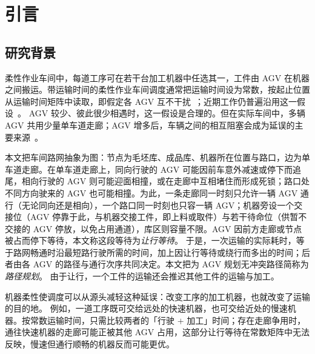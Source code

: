 \documentclass[manuscript,screen,review]{acmart}
\begin{document}
\maketitle
\section{引言}
\label{sec:Chapter_I}

\subsection{研究背景}

柔性作业车间中，每道工序可在若干台加工机器中任选其一，工件由 AGV 在机器之间搬运。带运输时间的柔性作业车间调度通常把运输时间设为常数，按起止位置从运输时间矩阵中读取，即假定各 AGV 互不干扰~\cite{xin2025review}；近期工作仍普遍沿用这一假设~\cite{meng2025cp,qin2026knowledge,jafarian2026integrated}。
AGV 较少、彼此很少相遇时，这一假设是合理的。但在实际车间中，多辆 AGV 共用少量单车道走廊；AGV 增多后，车辆之间的相互阻塞会成为延误的主要来源~\cite{kim2026congestion,hardai2025matrix}。

本文把车间路网抽象为图：节点为毛坯库、成品库、机器所在位置与路口，边为单车道走廊。在单车道走廊上，同向行驶的 AGV 可能因前车意外减速或停下而追尾，相向行驶的 AGV 则可能迎面相撞，或在走廊中互相堵住而形成死锁；路口处不同方向驶来的 AGV 也可能相撞。为此，一条走廊同一时刻只允许一辆 AGV 通行（无论同向还是相向），一个路口同一时刻也只容一辆 AGV；机器旁设一个交接位（AGV 停靠于此，与机器交接工件，即上料或取件）与若干待命位（供暂不交接的 AGV 停放，以免占用通道），库区则容量不限。AGV 因前方走廊或节点被占而停下等待，本文称这段等待为\emph{让行等待}。
于是，一次运输的实际耗时，等于路网畅通时沿最短路行驶所需的时间，加上因让行等待或绕行而多出的时间；后者由各 AGV 的路径与通行次序共同决定。本文把为 AGV 规划无冲突路径简称为\emph{路径规划}。
由于让行，一个工件的运输还会推迟其他工件的运输与加工。

机器柔性使调度可以从源头减轻这种延误：改变工序的加工机器，也就改变了运输的目的地。
例如，一道工序既可交给远处的快速机器，也可交给近处的慢速机器。按常数运输时间，只需比较两者的「行驶 $+$ 加工」时间；存在走廊争用时，通往快速机器的走廊可能正被其他 AGV 占用，这部分让行等待在常数矩阵中无法反映，慢速但通行顺畅的机器反而可能更优。
\end{document}
